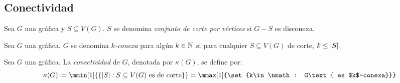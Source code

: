 \subsection{Conectividad}
\begin{definition}
	Sea $G$ una gráfica y $S\subseteq V(G)$. $S$ se denomina \emph{conjunto de corte por vértices} si $G - S$ es disconexa. 
\end{definition}
\begin{definition}[Conexidad]
	Sea $G$ una gráfica. $G$ se denomina \emph{$k$-conexa} para algún $k\in\mathbb{N}^{}$ si para cualquier $S\subseteq V(G)$ de corte, $k\leq\left\vert S \right\vert$.
\end{definition}
\begin{definition}[Conectividad]
	Sea $G$ una gráfica. La \emph{conectividad} de $G$, denotada por $\kappa(G)$, se define por:
	\[ \kappa(G)\coloneqq\mmin[1]{\set{\abs{S}: S\subseteq V(G)\text{ es de corte}}} =\mmax[1]{\set{k\in\nmath: G\text{ es $k$-conexa}}} \]
\end{definition}